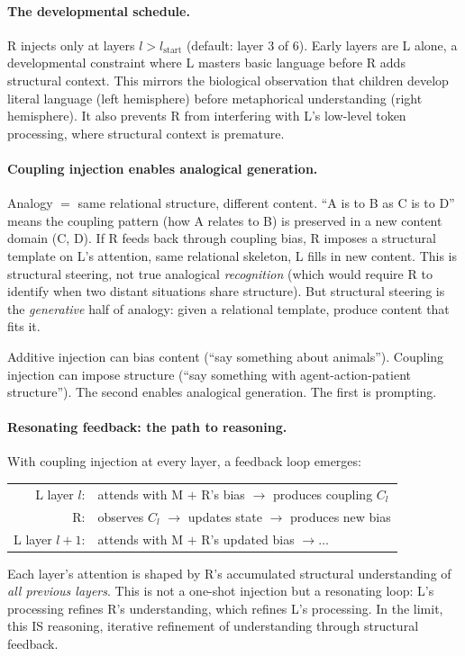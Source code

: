 \documentclass[11pt, a4paper]{article}
\theoremstyle{plain}
\theoremstyle{definition}
\theoremstyle{remark}
\begin{document}
\paragraph{The developmental schedule.}
R injects only at layers $l > l_{\mathrm{start}}$ (default: layer 3 of 6).
Early layers are L alone, a developmental constraint where L masters basic language before R adds structural context.
This mirrors the biological observation that children develop literal language (left hemisphere) before metaphorical understanding (right hemisphere).
It also prevents R from interfering with L's low-level token processing, where structural context is premature.

\paragraph{Coupling injection enables analogical generation.}
Analogy $=$ same relational structure, different content.
``A is to B as C is to D'' means the coupling pattern (how A relates to B) is preserved in a new content domain (C, D).
If R feeds back through coupling bias, R imposes a structural template on L's attention, same relational skeleton, L fills in new content.
This is structural steering, not true analogical \emph{recognition} (which would require R to identify when two distant situations share structure).
But structural steering is the \emph{generative} half of analogy: given a relational template, produce content that fits it.

Additive injection can bias content (``say something about animals'').
Coupling injection can impose structure (``say something with agent-action-patient structure'').
The second enables analogical generation.
The first is prompting.

\paragraph{Resonating feedback: the path to reasoning.}
With coupling injection at every layer, a feedback loop emerges:
\begin{center}\small
\begin{tabular}{rl}
L layer $l$: & attends with M $+$ R's bias $\to$ produces coupling $C_l$ \\
R: & observes $C_l$ $\to$ updates state $\to$ produces new bias \\
L layer $l{+}1$: & attends with M $+$ R's updated bias $\to \ldots$ \\
\end{tabular}
\end{center}
Each layer's attention is shaped by R's accumulated structural understanding of \emph{all previous layers}.
This is not a one-shot injection but a resonating loop: L's processing refines R's understanding, which refines L's processing.
In the limit, this IS reasoning, iterative refinement of understanding through structural feedback.
\end{document}
